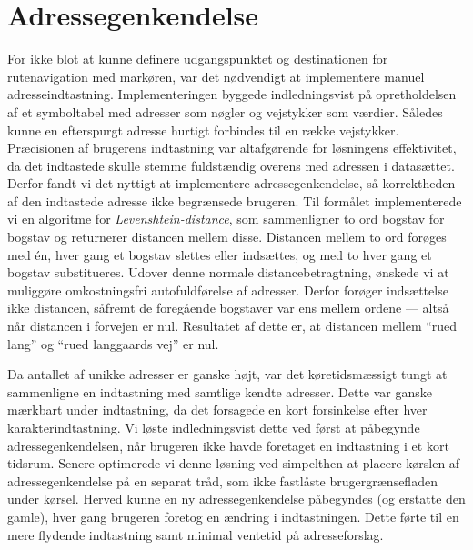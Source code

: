 \section{Adressegenkendelse}
For ikke blot at kunne definere udgangspunktet og destinationen for rutenavigation med markøren, var det nødvendigt at implementere manuel adresseindtastning. Implementeringen byggede indledningsvist på opretholdelsen af et symboltabel med adresser som nøgler og  vejstykker som værdier. Således kunne en efterspurgt adresse hurtigt forbindes til en række vejstykker. Præcisionen af brugerens indtastning var altafgørende for løsningens effektivitet, da det indtastede skulle stemme fuldstændig overens med adressen i datasættet. Derfor fandt vi det nyttigt at implementere adressegenkendelse, så korrektheden af den indtastede adresse ikke begrænsede brugeren. Til formålet implementerede vi en algoritme for \emph{Levenshtein-distance}, som sammenligner to ord bogstav for bogstav og returnerer distancen mellem disse. Distancen mellem to ord forøges med én, hver gang et bogstav slettes eller indsættes, og med to hver gang et bogstav substitueres. Udover denne normale distancebetragtning, ønskede vi at muliggøre omkostningsfri autofuldførelse af adresser. Derfor forøger indsættelse ikke distancen, såfremt de foregående bogstaver var ens mellem ordene --- altså når distancen i forvejen er nul. Resultatet af dette er, at distancen mellem ``rued lang'' og ``rued langgaards vej'' er nul.

Da antallet af unikke adresser er ganske højt, var det køretidsmæssigt tungt at sammenligne en indtastning med samtlige kendte adresser. Dette var ganske mærkbart under indtastning, da det forsagede en kort forsinkelse efter hver karakterindtastning. Vi løste indledningsvist dette ved først at påbegynde adressegenkendelsen, når brugeren ikke havde foretaget en indtastning i et kort tidsrum. Senere optimerede vi denne løsning ved simpelthen at placere kørslen af adressegenkendelse på en separat tråd, som ikke fastlåste brugergrænsefladen under kørsel. Herved kunne en ny adressegenkendelse påbegyndes (og erstatte den gamle), hver gang brugeren foretog en ændring i indtastningen. Dette førte til en mere flydende indtastning samt minimal ventetid på adresseforslag.